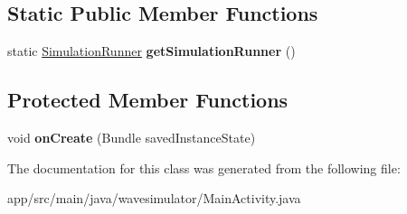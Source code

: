 \subsection*{Static Public Member Functions}
\begin{DoxyCompactItemize}
\item 
\mbox{\label{classwavesimulator_1_1MainActivity_a79c45b397d8e357efbf26d07822b93dc}} 
static \hyperlink{classSolver_1_1SimulationRunner}{Simulation\+Runner} {\bfseries get\+Simulation\+Runner} ()
\end{DoxyCompactItemize}
\subsection*{Protected Member Functions}
\begin{DoxyCompactItemize}
\item 
\mbox{\label{classwavesimulator_1_1MainActivity_ac68987419bcdc1f93e4501a7642dbf04}} 
void {\bfseries on\+Create} (Bundle saved\+Instance\+State)
\end{DoxyCompactItemize}


The documentation for this class was generated from the following file\+:\begin{DoxyCompactItemize}
\item 
app/src/main/java/wavesimulator/Main\+Activity.\+java\end{DoxyCompactItemize}
